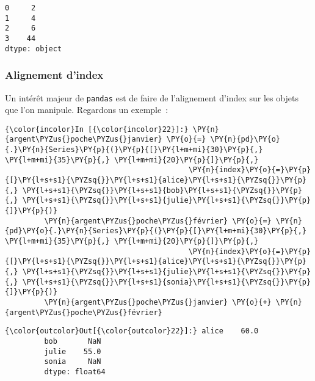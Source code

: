    \begin{Verbatim}[commandchars=\\\{\},frame=single,framerule=0.3mm,rulecolor=\color{cellframecolor}]
0     2
1     4
2     6
3    44
dtype: object
\end{Verbatim}

    \hypertarget{alignement-dindex}{%
\subsubsection{Alignement d'index}\label{alignement-dindex}}

    Un intérêt majeur de \texttt{pandas} est de faire de l'alignement
d'index sur les objets que l'on manipule. Regardons un exemple~:

    \begin{Verbatim}[commandchars=\\\{\},frame=single,framerule=0.3mm,rulecolor=\color{cellframecolor}]
{\color{incolor}In [{\color{incolor}22}]:} \PY{n}{argent\PYZus{}poche\PYZus{}janvier} \PY{o}{=} \PY{n}{pd}\PY{o}{.}\PY{n}{Series}\PY{p}{(}\PY{p}{[}\PY{l+m+mi}{30}\PY{p}{,} \PY{l+m+mi}{35}\PY{p}{,} \PY{l+m+mi}{20}\PY{p}{]}\PY{p}{,}
                                          \PY{n}{index}\PY{o}{=}\PY{p}{[}\PY{l+s+s1}{\PYZsq{}}\PY{l+s+s1}{alice}\PY{l+s+s1}{\PYZsq{}}\PY{p}{,} \PY{l+s+s1}{\PYZsq{}}\PY{l+s+s1}{bob}\PY{l+s+s1}{\PYZsq{}}\PY{p}{,} \PY{l+s+s1}{\PYZsq{}}\PY{l+s+s1}{julie}\PY{l+s+s1}{\PYZsq{}}\PY{p}{]}\PY{p}{)}
         \PY{n}{argent\PYZus{}poche\PYZus{}février} \PY{o}{=} \PY{n}{pd}\PY{o}{.}\PY{n}{Series}\PY{p}{(}\PY{p}{[}\PY{l+m+mi}{30}\PY{p}{,} \PY{l+m+mi}{35}\PY{p}{,} \PY{l+m+mi}{20}\PY{p}{]}\PY{p}{,}
                                          \PY{n}{index}\PY{o}{=}\PY{p}{[}\PY{l+s+s1}{\PYZsq{}}\PY{l+s+s1}{alice}\PY{l+s+s1}{\PYZsq{}}\PY{p}{,} \PY{l+s+s1}{\PYZsq{}}\PY{l+s+s1}{julie}\PY{l+s+s1}{\PYZsq{}}\PY{p}{,} \PY{l+s+s1}{\PYZsq{}}\PY{l+s+s1}{sonia}\PY{l+s+s1}{\PYZsq{}}\PY{p}{]}\PY{p}{)}
         \PY{n}{argent\PYZus{}poche\PYZus{}janvier} \PY{o}{+} \PY{n}{argent\PYZus{}poche\PYZus{}février}
\end{Verbatim}


\begin{Verbatim}[commandchars=\\\{\},frame=single,framerule=0.3mm,rulecolor=\color{cellframecolor}]
{\color{outcolor}Out[{\color{outcolor}22}]:} alice    60.0
         bob       NaN
         julie    55.0
         sonia     NaN
         dtype: float64
\end{Verbatim}
            

